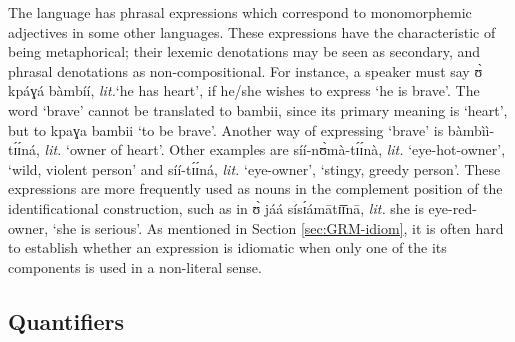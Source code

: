 \begin{exe}
\begin{exe}
\begin{exe}
{\begin{exe}
\begin{exe}
\begin{exe}
\begin{exe}
\begin{exe}
\begin{exe}
\begin{exe}
The language has phrasal expressions which correspond to  monomorphemic
adjectives in some other languages. These expressions have the characteristic of
being metaphorical; their lexemic denotations may be seen as secondary, and
phrasal  denotations as non-compositional. For instance, a speaker must say 
{\sls ʊ̀ kpáɣá bàmbíí}, {\it lit.}`he has heart', if he/she wishes to express 
`he 
is
brave'. The word `brave' cannot be translated to {\sls bambii}, since its 
primary
meaning is `heart',  but to {\sls kpaɣa bambii}  `to be brave'. Another way of
expressing `brave'  is {\sls bàmbìì-tɪ́ɪ́ná}, {\it lit.} `owner of heart'. Other
examples  are {\sls síí-nʊ̀mà-tɪ́ɪ́nà}, {\it lit.} `eye-hot-owner', `wild,
violent  person'   and {\sls síí-tɪ́ɪ́ná}, {\it lit.} `eye-owner', `stingy,
greedy person'. These expressions are more frequently used as nouns in the
complement position of the identificational construction, such as in {\sls ʊ̀
jáá sísɪ́ámātɪ̄ɪ̄nā}, {\it lit.} she is eye-red-owner, `she is serious'.
As mentioned in Section \ref{sec:GRM-idiom},  it is often hard to establish
whether an expression is idiomatic when only one of the its components
is used in a non-literal sense.



% 
% 




\subsection{Quantifiers}
\label{sec:GRM-quantifier}



\end{exe}
\end{exe}
\end{exe}
\end{exe}
\end{exe}
\end{exe}
\end{exe}}
\end{exe}
\end{exe}
\end{exe}
